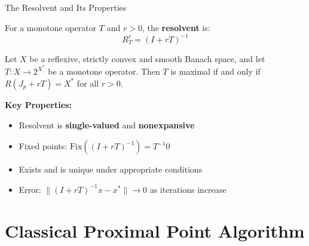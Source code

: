 \documentclass[aspectratio=169,10pt]{beamer}
\begin{document}
\begin{frame}{The Resolvent and Its Properties}
    \begin{definition}
        For a monotone operator $T$ and $r > 0$, the \textbf{resolvent} is:
        \[
            R_T^r = (I + rT)^{-1}
        \]
    \end{definition}

    \begin{theorem}[Rockafellar 1976]
        Let $X$ be a reflexive, strictly convex and smooth Banach space, and let
        $T: X \to 2^{X^*}$ be a monotone operator. Then $T$ is maximal if and only if
        $R(J_p + rT) = X^*$ for all $r > 0$.
    \end{theorem}

    \vspace{0.3cm}
    \textbf{Key Properties:}
    \begin{itemize}
        \item Resolvent is \textbf{single-valued} and \textbf{nonexpansive}
        \item Fixed points: $\text{Fix}((I + rT)^{-1}) = T^{-1}0$
        \item Exists and is unique under appropriate conditions
        \item Error: $\|(I + rT)^{-1}x - x^*\| \to 0$ as iterations increase
    \end{itemize}
\end{frame}

\section{Classical Proximal Point Algorithm}
\end{document}
